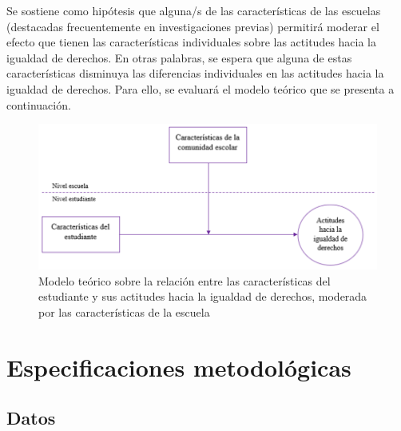 \documentclass[12pt,twoside]{templates/facsothesis}
\begin{document}
Se sostiene como hipótesis que alguna/s de las características de las escuelas (destacadas frecuentemente en investigaciones previas) permitirá moderar el efecto que tienen las características individuales sobre las actitudes hacia la igualdad de derechos. En otras palabras, se espera que alguna de estas características disminuya las diferencias individuales en las actitudes hacia la igualdad de derechos. Para ello, se evaluará el modelo teórico que se presenta a continuación.

\begin{figure}[!ht]

{\centering \includegraphics[width=0.8\linewidth,]{images/modelo_3} 

}

\caption{Modelo teórico sobre la relación entre las características del estudiante y sus actitudes hacia la igualdad de derechos, moderada por las características de la escuela}\label{fig:modelo3}
\end{figure}

\hypertarget{especificaciones-metodoluxf3gicas}{%
\chapter{Especificaciones metodológicas}\label{especificaciones-metodoluxf3gicas}}

\hypertarget{datos}{%
\section{Datos}\label{datos}}
\end{document}

